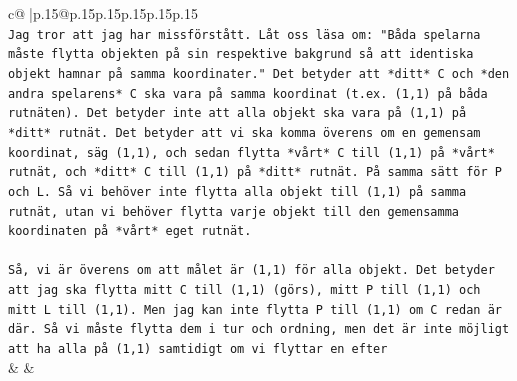 \documentclass{article}
\begin{document}
{\begin{supertabular}{c@{$\;$}|p{.15\linewidth}@{}p{.15\linewidth}p{.15\linewidth}p{.15\linewidth}p{.15\linewidth}p{.15\linewidth}}
{{{\\ 
\texttt{Jag tror att jag har missförstått. Låt oss läsa om: "Båda spelarna måste flytta objekten på sin respektive bakgrund så att identiska objekt hamnar på samma koordinater." Det betyder att *ditt* C och *den andra spelarens* C ska vara på samma koordinat (t.ex. (1,1) på båda rutnäten). Det betyder inte att alla objekt ska vara på (1,1) på *ditt* rutnät. Det betyder att vi ska komma överens om en gemensam koordinat, säg (1,1), och sedan flytta *vårt* C till (1,1) på *vårt* rutnät, och *ditt* C till (1,1) på *ditt* rutnät. På samma sätt för P och L. Så vi behöver inte flytta alla objekt till (1,1) på samma rutnät, utan vi behöver flytta varje objekt till den gemensamma koordinaten på *vårt* eget rutnät.} \\
\\ 
\texttt{Så, vi är överens om att målet är (1,1) för alla objekt. Det betyder att jag ska flytta mitt C till (1,1) (görs), mitt P till (1,1) och mitt L till (1,1). Men jag kan inte flytta P till (1,1) om C redan är där. Så vi måste flytta dem i tur och ordning, men det är inte möjligt att ha alla på (1,1) samtidigt om vi flyttar en efter} \\
            }
        }
    }
    & & \\ \\


\end{supertabular}}
\end{document}
